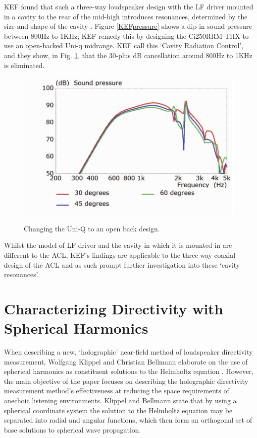 \documentclass{report}
\begin{document}
        KEF found that such a three-way loudspeaker design with the LF driver mounted in a cavity to the rear of the mid-high introduces resonances, determined by the size and shape of the cavity \cite{KEFCi}.
        Figure \ref{KEFpressure} shows a dip in sound pressure between 800Hz to 1KHz; KEF remedy this by designing the Ci250RRM-THX to use an open-backed Uni-q midrange.
        KEF call this `Cavity Radiation Control', and they show, in Fig. \ref{KEFopenback}, that the 30-plus dB cancellation around 800Hz to 1KHz is eliminated.

        \begin{figure}[H]
            \centering
            \includegraphics[scale=0.8]{figs/KEFopenback.png}
            \caption{Changing the Uni-Q to an open back design.}\cite{KEFCi}
            \label{KEFopenback}
        \end{figure}

        Whilst the model of LF driver and the cavity in which it is mounted in are different to the ACL, KEF's findings are applicable to the three-way coaxial design of the ACL and as such prompt further investigation into these `cavity resonances'.

    \section{Characterizing Directivity with Spherical Harmonics} 
        When describing a new, `holographic' near-field method of loudspeaker directivity measurement, Wolfgang Klippel and Christian Bellmann elaborate on the use of spherical harmonics as constituent solutions to the Helmholtz equation \cite{klippel2016holographic}.
        However, the main objective of the paper focuses on describing the holographic directivity measurement method's effectiveness at reducing the space requirements of anechoic listening environments.
        Klippel and Bellmann state that by using a spherical coordinate system the solution to the Helmholtz equation may be separated into radial and angular functions, which then form an orthogonal set of base solutions to spherical wave propagation.
\end{document}
